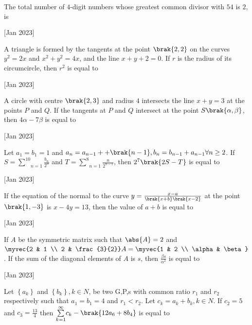     \item The total number of $4$-digit numbers whose greatest common divisor with $54$ is $2$, is
    
    \hfill{[Jan 2023]}

    \item A triangle is formed by the tangents at the point $\brak{2,2}$ on the curves $y^2=2x$ and $x^2+y^2=4x$, and the line $x+y+2=0$. If $r$ is the radius of its circumcircle, then $r^2$ is equal to
    
    \hfill{[Jan 2023]}
		
    \item A circle with centre $\brak{2,3}$ and radius $4$ intersects the line $x+y=3$ at the points $P$ and $Q$. If the tangents at $P$ and $Q$ intersect at the point $S\brak{\alpha,\beta}$, then $4\alpha-7\beta$ is equal to
    
    \hfill{[Jan 2023]}

    \item Let $a_1=b_1=1$ and $a_n=a_{n-1}++\brak{n-1},b_n=b_{n-1}+a_{n-1}\forall n\geq2$. If $S=\underset{n=1}{\overset{10}{\sum}}\frac{b_n}{2^n}$ and $T=\underset{n=1}{\overset{8}{\sum}}\frac{n}{2^{n-1}}$, then $2^7\brak{2S-T}$ is equal to
    
    \hfill{[Jan 2023]}

    \item If the equation of the normal to the curve $y=\frac{x-a}{\brak{x+b}\brak{x-2}}$ at the point $\brak{1,-3}$ is $x-4y=13$, then the value of $a+b$ is equal to
    
    \hfill{[Jan 2023]}
        
    \item If $A$ be the symmetric matrix such that $\abs{A}=2$ and $\myvec{2 & 1 \\ 2 & \frac{3}{2}}A=\myvec{1 & 2 \\ \alpha & \beta}$. If the sum of the diagonal elements of $A$ is $s$, then $\frac{\beta s}{\alpha^2}$ is equal to 
    
    \hfill{[Jan 2023]}

    \item Let $\left\{ a_k\right\}$ and $\left\{ b_k\right\}, k\in N$, be two G,P,s with common ratio $r_1$ and $r_2$ respectively such that $a_1=b_1=4$ and $r_1<r_2$. Let $c_k=a_k+b_k,k\in N$. If $c_2=5$ and $c_3=\frac{13}{4}$ then $\underset{k=1}{\overset{\infty}{\sum}}c_k-\brak{12a_6+8b_4}$ is equal to
    
